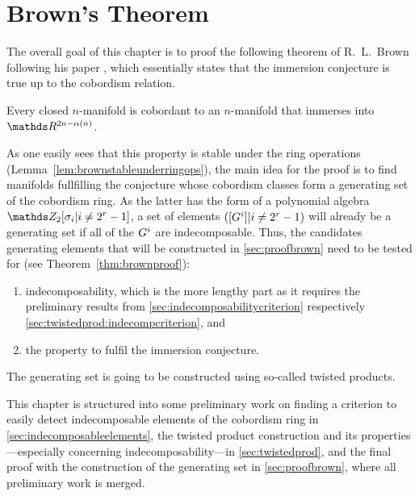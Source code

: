 % 

\chapter{Brown's Theorem}
The overall goal of this chapter is to proof the following theorem of
R.~L.~Brown following his paper \cite{brown},
which essentially states that the immersion conjecture is true up to
the cobordism relation.
\begin{Thm}[Brown]\label{thm:brown}
  Every closed $n$-manifold is cobordant to an $n$-manifold that immerses
  into $\R^{2n-\alpha(n)}$.
\end{Thm}

As one easily sees that this property is stable under
the ring operations (Lemma~\autoref{lem:brownstableunderringops}),
the main idea for the proof is to find manifolds
fullfilling the conjecture whose cobordism classes form a generating set
of the cobordism ring.
As the latter has the form of a polynomial algebra
$\Zmod2[\sigma_i|i\neq 2^r-1]$, a set of elements
$([G^{i}]|i\neq2^r-1)$ will already be a generating set if all of the
$G^{i}$ are indecomposable.
Thus, the candidates generating elements that will be constructed
in \autoref{sec:proofbrown} need to be tested for (see
Theorem~\autoref{thm:brownproof}):
\begin{enumerate}
\item indecomposability, which is the more lengthy part as it
  requires the preliminary results from
  \autoref{sec:indecomposabilitycriterion} respectively
  \autoref{sec:twistedprod:indecompcriterion}, and
\item the property to fulfil the immersion conjecture.
\end{enumerate}
The generating set is going to be constructed using so-called twisted
products.

This chapter is structured into some preliminary work on finding a
criterion to easily detect indecomposable elements of the cobordism
ring in \autoref{sec:indecomposableelements},
the twisted product construction and its properties---especially
concerning indecomposability---in
\autoref{sec:twistedprod}, and the final proof with the construction
of the generating set in \autoref{sec:proofbrown}, where all
preliminary work is merged.

